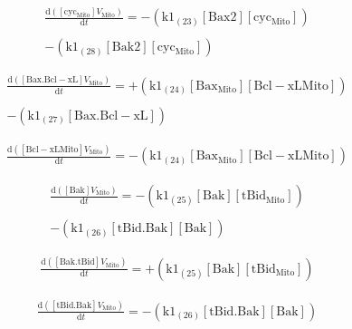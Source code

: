 \documentclass[a4paper,12pt]{article} %
\newcommand{\M}[1]{\mathrm{#1}}
\begin{document}
\begin{equation}
\begin{split}
\frac {\M{d}( {{\M{[cyc_{Mito}]}}    {V}_{\M{Mito}} } ) }  {\M{d}{t} }  =  {  -  ( {{\M{k1}}_{\M{(23)}}    {\M{[Bax2]}}    {\M{[cyc_{Mito}]}} } ) } \\ 
  \\ 
   {  -  ( {{\M{k1}}_{\M{(28)}}    {\M{[Bak2]}}    {\M{[cyc_{Mito}]}} } ) }
\end{split}
\end{equation}


\begin{equation}
\begin{split}
\frac {\M{d}( {{\M{[Bax.Bcl-xL]}}    {V}_{\M{Mito}} } ) }  {\M{d}{t} }  =  {  +  ( {{\M{k1}}_{\M{(24)}}    {\M{[Bax_{Mito}]}}    {\M{[Bcl-xL{Mito}]}} } ) } \\ 
  \\ 
   {  -  ( {{\M{k1}}_{\M{(27)}}    {\M{[Bax.Bcl-xL]}} } ) }
\end{split}
\end{equation}

\begin{equation}
\begin{split}
\frac {\M{d}( {{\M{[Bcl-xL{Mito}]}}    {V}_{\M{Mito}} } ) }  {\M{d}{t} }  =  {  -  ( {{\M{k1}}_{\M{(24)}}    {\M{[Bax_{Mito}]}}    {\M{[Bcl-xL{Mito}]}} } ) }
\end{split}
\end{equation}

\begin{equation}
\begin{split}
\frac {\M{d}( {{\M{[Bak]}}    {V}_{\M{Mito}} } ) }  {\M{d}{t} }  =  {  -  ( {{\M{k1}}_{\M{(25)}}    {\M{[Bak]}}    {\M{[tBid_{Mito}]}} } ) } \\ 
  \\ 
   {  -  ( {{\M{k1}}_{\M{(26)}}    {\M{[tBid.Bak]}}    {\M{[Bak]}} } ) }
\end{split}
\end{equation}

\begin{equation}
\begin{split}
\frac {\M{d}( {{\M{[Bak.tBid]}}    {V}_{\M{Mito}} } ) }  {\M{d}{t} }  =  {  +  ( {{\M{k1}}_{\M{(25)}}    {\M{[Bak]}}    {\M{[tBid_{Mito}]}} } ) }
\end{split}
\end{equation}

\begin{equation}
\begin{split}
\frac {\M{d}( {{\M{[tBid.Bak]}}    {V}_{\M{Mito}} } ) }  {\M{d}{t} }  =  {  -  ( {{\M{k1}}_{\M{(26)}}    {\M{[tBid.Bak]}}    {\M{[Bak]}} } ) } 
\end{split}
\end{equation}
\end{document}
